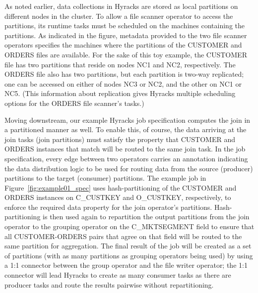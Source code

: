 As noted earlier, data collections in Hyracks are stored as local partitions on different nodes in the cluster.
To allow a file scanner operator to access the partitions, its runtime tasks must be scheduled on the machines containing the partitions.
As indicated in the figure, metadata provided to the two file scanner operators specifies the machines where the partitions of the CUSTOMER
and ORDERS files are available.
For the sake of this toy example, the CUSTOMER file has two partitions that reside on nodes NC1 and NC2, respectively.
The ORDERS file also has two partitions, but each partition is two-way replicated;
one can be accessed on either of nodes NC3 or NC2, and the other on NC1 or NC5.
(This information about replication gives Hyracks multiple scheduling options for the ORDERS file scanner's tasks.)

Moving downstream, our example Hyracks job specification computes the join in a partitioned manner as well.
To enable this, of course, the data arriving at the join tasks (join partitions) must satisfy the property that
CUSTOMER and ORDERS instances that match will be routed to the same join task.
In the job specification, every edge between two operators carries an annotation indicating the data distribution
logic to be used for routing data from the source (producer) partitions to the target (consumer) partitions.
The example job in Figure~\ref{fig:example01_spec} uses hash-partitioning of the CUSTOMER and ORDERS instances on
C\_CUSTKEY and O\_CUSTKEY, respectively, to enforce the required data property for the join operator's partitions.
Hash-partitioning is then used again to repartition the output partitions from the join operator to the grouping
operator on the C\_MKTSEGMENT field to ensure that all CUSTOMER-ORDERS pairs that agree on that field will be routed
to the same partition for aggregation.  The final result of the job will be created as a set of partitions (with as
many partitions as grouping operators being used) by using a 1:1 connector between the group operator and the file
writer operator; the 1:1 connector will lead Hyracks to create as many consumer tasks as there are producer tasks and
route the results pairwise without repartitioning.

